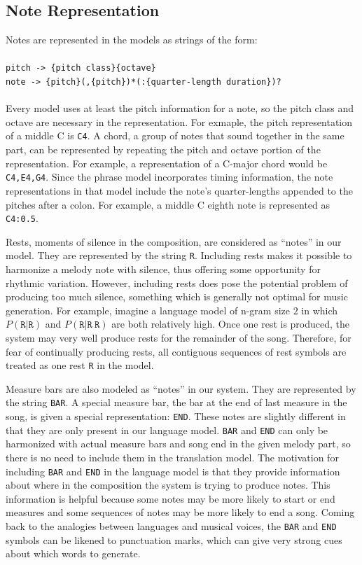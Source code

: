 \documentclass{sig-alternate}
\begin{document}
\subsection{Note Representation}
Notes are represented in the models as strings of the form:\\
\\
\texttt{pitch -> \{pitch class\}\{octave\}}\\
\texttt{note -> \{pitch\}(,\{pitch\})*(:\{quarter-length duration\})?}\\
\\
Every model uses at least the pitch information for a note, so the pitch class and octave are necessary in the representation. For exmaple, the pitch representation of a middle C is \texttt{C4}. A chord, a group of notes that sound together in the same part, can be represented by repeating the pitch and octave portion of the representation. For example, a representation of a C-major chord would be \texttt{C4,E4,G4}. Since the phrase model incorporates timing information, the note representations in that model include the note's quarter-lengths appended to the pitches after a colon. For example, a middle C eighth note is represented as \texttt{C4:0.5}.

Rests, moments of silence in the composition, are considered as ``notes'' in our model. They are represented by the string \texttt{R}. Including rests makes it possible to harmonize a melody note with silence, thus offering some opportunity for rhythmic variation. However, including rests does pose the potential problem of producing too much silence, something which is generally not optimal for music generation. For example, imagine a language model of n-gram size $2$ in which $P(\texttt{R} | \texttt{R})$ and $P (\texttt{R} | \texttt{R}\ \texttt{R})$ are both relatively high. Once one rest is produced, the system may very well produce rests for the remainder of the song. Therefore, for fear of continually producing rests, all contiguous sequences of rest symbols are treated as one rest \texttt{R} in the model.

Measure bars are also modeled as ``notes'' in our system. They are represented by the string \texttt{BAR}. A special measure bar, the bar at the end of last measure in the song, is given a special representation: \texttt{END}. These notes are slightly different in that they are only present in our language model. \texttt{BAR} and \texttt{END} can only be harmonized with actual measure bars and song end in the given melody part, so there is no need to include them in the translation model. The motivation for including \texttt{BAR} and \texttt{END} in the language model is that they provide information about where in the composition the system is trying to produce notes. This information is helpful because some notes may be more likely to start or end measures and some sequences of notes may be more likely to end a song. Coming back to the analogies between languages and musical voices, the \texttt{BAR} and \texttt{END} symbols can be likened to punctuation marks, which can give very strong cues about which words to generate.
\end{document}

